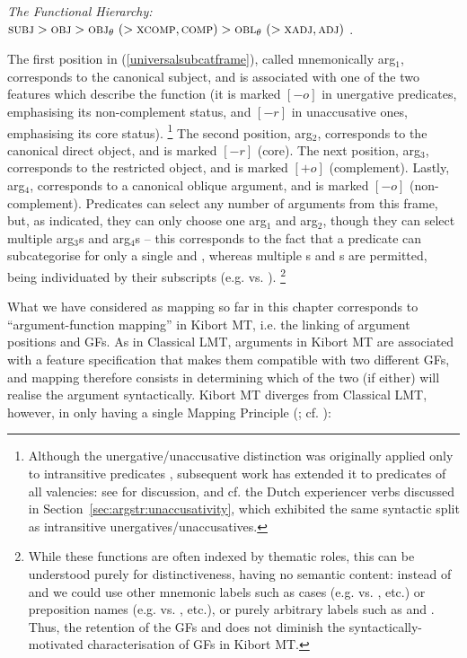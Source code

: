 \documentclass[output=paper]{langscibook}
\begin{document}
\begin{exe}
\ex \label{ex:functional-hierarchy-repeat}\textit{The Functional Hierarchy:}\\
$\textsc{subj}{} > \textsc{obj}{} > \mbox{\textsc{obj}$_{\theta}$}{}\ (> \textsc{xcomp}{}, \textsc{comp}{}) > \mbox{\textsc{obl}$_{\theta}$}{}\ (> \textsc{xadj}{}, \textsc{adj}{})$ .
\end{exe}
%
The first position in (\ref{universalsubcatframe}), called mnemonically
arg$_{1}$, corresponds to the canonical subject, and is associated with one of
the two features which describe the \SUBJ function (it is marked $[-o]$ in
unergative predicates, emphasising its non-complement status, and $[-r]$ in
unaccusative ones, emphasising its core status).%
%
\footnote{Although the unergative\slash unaccusative distinction was originally
  applied only to intransitive predicates \citep{Perlmutter1978}, subsequent
  work has extended it to predicates of all valencies: see
  \citet[74--75]{Kibort2004} for discussion, and cf. the Dutch experiencer verbs
  discussed in Section~\ref{sec:argstr:unaccusativity}, which exhibited the same
  syntactic split as intransitive unergatives\slash unaccusatives.}
%
The second position, arg$_{2}$, corresponds to the canonical direct object, and
is marked $[-r]$ (core). The next position, arg$_{3}$, corresponds to the
restricted object, and is marked $[+o]$ (complement). Lastly, arg$_{4}$,
corresponds to a canonical oblique argument, and is marked $[-o]$
(non-complement). Predicates can select any number of arguments from this frame,
but, as indicated, they can only choose one arg$_{1}$ and arg$_{2}$, though they
can select multiple arg$_{3}$s and arg$_{4}$s -- this corresponds to the fact
that a predicate can subcategorise for only a single \SUBJ and \OBJ, whereas
multiple \OBJTHETA{}s and \OBLTHETA{}s are permitted, being individuated by
their subscripts (e.g.  vs. ).%
%
\footnote{While these functions are often indexed by thematic roles, this can be
  understood purely for distinctiveness, having no semantic content: instead of
   and  we could use other mnemonic labels such as
  cases (e.g.  vs. , etc.) or preposition names (e.g.
   vs. , etc.), or purely arbitrary labels such as
   and . Thus, the retention of the GFs \OBJTHETA and
  \OBLTHETA does not diminish the syntactically-motivated characterisation of
  GFs in Kibort MT.}
%

What we have considered as mapping so far in this chapter corresponds to
``argument-function mapping'' in Kibort MT, i.e. the linking of argument
positions and GFs. As in Classical LMT, arguments in Kibort MT are associated
with a feature specification that makes them compatible with two different GFs,
and mapping therefore consists in determining which of the two (if either) will
realise the argument syntactically. Kibort MT diverges from Classical LMT,
however, in only having a single Mapping Principle (\citealp[267]{kibort14}; cf.
\citealt{Her2013}):
\end{document}
